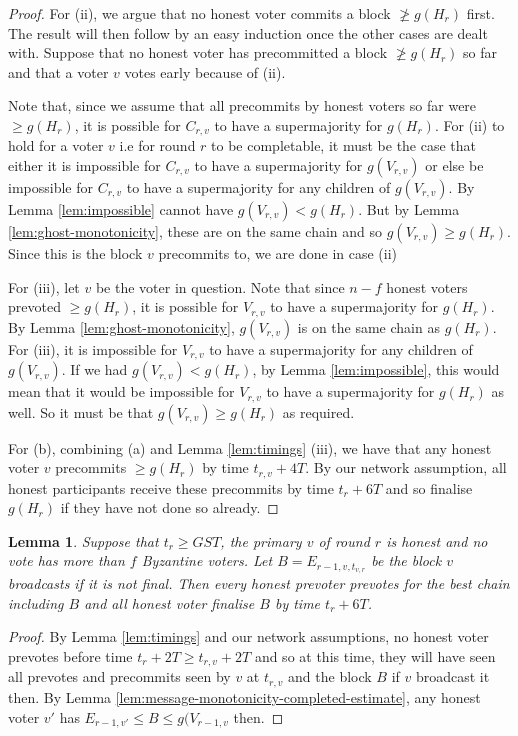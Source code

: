 \documentclass{article}
\newtheorem{lemma}[theorem]{Lemma}
\begin{document}
{\begin{proof}
For (ii), we argue that no honest voter commits a block $\not\geq g(H_r)$ first. The result will then follow by an easy induction once the other cases are dealt with. Suppose that no honest voter has precommitted a block $\not \geq g(H_r)$ so far and that a voter $v$ votes early because of (ii).

Note that, since we assume that all precommits by honest voters so far were $\geq g(H_r)$, it is possible for $C_{r,v}$ to have a supermajority for $g(H_r)$. For (ii) to hold for a voter $v$ i.e for round $r$ to be completable, it must be the case that either it is impossible for $C_{r,v}$ to have a supermajority for $g(V_{r,v})$ or else be impossible for $C_{r,v}$ to have a supermajority for any children of $g(V_{r,v})$. By Lemma \ref{lem:impossible} cannot have $g(V_{r,v}) < g(H_r)$. But by Lemma \ref{lem:ghost-monotonicity}, these are on the same chain and so $g(V_{r,v}) \geq g(H_r)$. Since this is the block $v$ precommits to, we are done in case (ii)

For (iii), let $v$ be the voter in question. Note that since $n-f$ honest voters prevoted $\geq g(H_r)$, it is possible for $V_{r,v}$ to have a supermajority for $g(H_r)$. By Lemma \ref{lem:ghost-monotonicity}, $g(V_{r,v})$ is on the same chain as $g(H_r)$. For (iii), it is impossible for $V_{r,v}$ to have a supermajority for any children of $g(V_{r,v})$. If we had $g(V_{r,v}) < g(H_r)$, by Lemma \ref{lem:impossible}, this would mean that it would be impossible for $V_{r,v}$ to have a supermajority for $g(H_r)$ as well. So it must be that $g(V_{r,v} )\geq g(H_r)$ as required.

For (b), combining (a) and Lemma \ref{lem:timings} (iii), we have that any honest voter $v$ precommits $\geq g(H_r)$ by time $t_{r,v}+4T$. By our network assumption, all honest participants receive these precommits by time $t_r+6T$ and so finalise $g(H_r)$ if they have not done so already.
\end{proof}

\begin{lemma} \label{lem:primary-finalises}
 Suppose that $t_r \geq GST$, the primary $v$ of round $r$ is honest and no vote has more than $f$ Byzantine voters. Let $B=E_{r-1,v,t_{v,r}}$ be the block $v$ broadcasts if it is not final. Then every honest prevoter prevotes for the best chain including $B$ and all honest voter finalise $B$ by time $t_r+6T$.
 \end{lemma}

\begin{proof} By Lemma \ref{lem:timings} and our network assumptions, no honest voter  prevotes before time $t_r+2T \geq t_{r,v}+2T$ and so at this time, they will have seen all prevotes and precommits seen by $v$ at $t_{r,v}$ and the block $B$ if $v$ broadcast it then. By Lemma \ref{lem:message-monotonicity-completed-estimate}, any honest voter $v'$ has $E_{r-1,v'} \leq B \leq g(V_{r-1,v}$ then.


\end{proof}}
\end{document}
